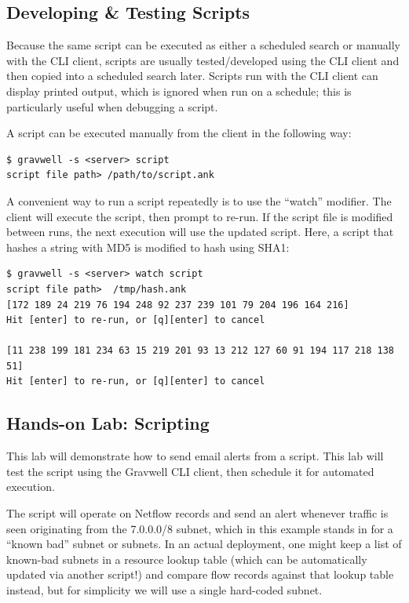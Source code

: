 \subsection{Developing \& Testing Scripts}

Because the same script can be executed as either a scheduled search or
manually with the CLI client, scripts are usually tested/developed using
the CLI client and then copied into a scheduled search later. Scripts
run with the CLI client can display printed output, which is ignored
when run on a schedule; this is particularly useful when debugging a
script.

A script can be executed manually from the client in the following
way:

\begin{Verbatim}[breaklines=true]
$ gravwell -s <server> script
script file path> /path/to/script.ank
\end{Verbatim}

A convenient way to run a script repeatedly is to use the ``watch''
modifier. The client will execute the script, then prompt to re-run. If
the script file is modified between runs, the next execution will use
the updated script. Here, a script that hashes a string with MD5 is
modified to hash using SHA1:

\begin{Verbatim}[breaklines=true]
$ gravwell -s <server> watch script
script file path>  /tmp/hash.ank
[172 189 24 219 76 194 248 92 237 239 101 79 204 196 164 216]
Hit [enter] to re-run, or [q][enter] to cancel

[11 238 199 181 234 63 15 219 201 93 13 212 127 60 91 194 117 218 138 51]
Hit [enter] to re-run, or [q][enter] to cancel
\end{Verbatim}


\subsection{Hands-on Lab: Scripting}

This lab will demonstrate how to send email alerts from a script. This
lab will test the script using the Gravwell CLI client, then schedule it
for automated execution.

The script will operate on Netflow records and send an alert whenever
traffic is seen originating from the 7.0.0.0/8 subnet, which in this
example stands in for a ``known bad'' subnet or subnets. In an actual
deployment, one might keep a list of known-bad subnets in a resource
lookup table (which can be automatically updated via another script!)
and compare flow records against that lookup table instead, but for
simplicity we will use a single hard-coded subnet.


